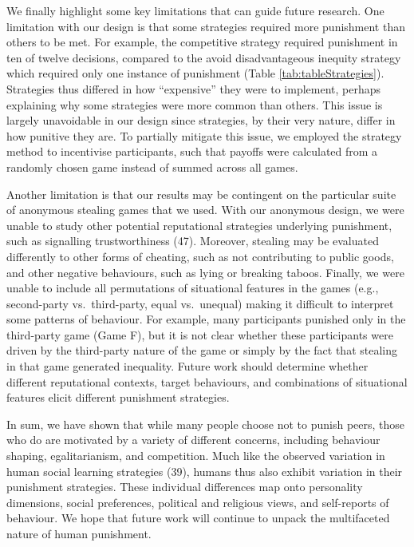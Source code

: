 \documentclass[
  man, donotrepeattitle,floatsintext]{apa6}
\begin{document}
We finally highlight some key limitations that can guide future research. One
limitation with our design is that some strategies required more punishment than
others to be met. For example, the competitive strategy required punishment in
ten of twelve decisions, compared to the avoid disadvantageous inequity strategy
which required only one instance of punishment (Table \ref{tab:tableStrategies}).
Strategies thus differed in how ``expensive'' they were to implement, perhaps
explaining why some strategies were more common than others. This issue is
largely unavoidable in our design since strategies, by their very nature, differ
in how punitive they are. To partially mitigate this issue, we employed the
strategy method to incentivise participants, such that payoffs were calculated
from a randomly chosen game instead of summed across all games.

Another limitation is that our results may be contingent on the particular suite
of anonymous stealing games that we used. With our anonymous design, we were
unable to study other potential reputational strategies underlying punishment,
such as signalling trustworthiness (47). Moreover, stealing may be
evaluated differently to other forms of cheating, such as not contributing to
public goods, and other negative behaviours, such as lying or breaking taboos.
Finally, we were unable to include all permutations of situational features in
the games (e.g., second-party vs.~third-party, equal vs.~unequal) making it
difficult to interpret some patterns of behaviour. For example, many
participants punished only in the third-party game (Game F), but it is not clear
whether these participants were driven by the third-party nature of the game or
simply by the fact that stealing in that game generated inequality. Future work
should determine whether different reputational contexts, target behaviours, and
combinations of situational features elicit different punishment strategies.

In sum, we have shown that while many people choose not to punish peers, those
who do are motivated by a variety of different concerns, including behaviour
shaping, egalitarianism, and competition. Much like the observed variation in
human social learning strategies (39), humans thus also exhibit
variation in their punishment strategies. These individual differences map onto
personality dimensions, social preferences, political and religious views, and
self-reports of behaviour. We hope that future work will continue to unpack the
multifaceted nature of human punishment.
\end{document}
